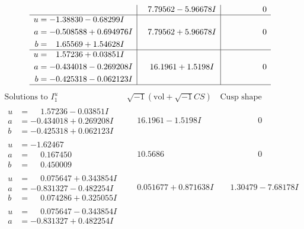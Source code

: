 \documentclass[1p]{elsarticle_modified}
\theoremstyle{definition}
\newcommand{\I}{\sqrt{-1}}
\begin{document}
$$\begin{array}{c|c|c}
 & \phantom{-}7.79562 - 5.96678 I & \phantom{-0.000000 } 0 \\ \hline\begin{aligned}
u &= -1.38830 - 0.68299 I \\
a &= -0.508588 + 0.694976 I \\
b &= \phantom{-}1.65569 + 1.54628 I\end{aligned}
 & \phantom{-}7.79562 + 5.96678 I & \phantom{-0.000000 } 0 \\ \hline\begin{aligned}
u &= \phantom{-}1.57236 + 0.03851 I \\
a &= -0.434018 - 0.269208 I \\
b &= -0.425318 - 0.062123 I\end{aligned}
 & \phantom{-}16.1961 + 1.5198 I & \phantom{-0.000000 } 0\\
 \hline 
 \end{array}$$\newpage$$\begin{array}{c|c|c}  
\text{Solutions to }I^u_{1}& \I (\text{vol} + \sqrt{-1}CS) & \text{Cusp shape}\\
 \hline 
\begin{aligned}
u &= \phantom{-}1.57236 - 0.03851 I \\
a &= -0.434018 + 0.269208 I \\
b &= -0.425318 + 0.062123 I\end{aligned}
 & \phantom{-}16.1961 - 1.5198 I & \phantom{-0.000000 } 0 \\ \hline\begin{aligned}
u &= -1.62467\phantom{ +0.000000I} \\
a &= \phantom{-}0.167450\phantom{ +0.000000I} \\
b &= \phantom{-}0.450009\phantom{ +0.000000I}\end{aligned}
 & \phantom{-}10.5686\phantom{ +0.000000I} & \phantom{-0.000000 } 0 \\ \hline\begin{aligned}
u &= \phantom{-}0.075647 + 0.343854 I \\
a &= -0.831327 - 0.482254 I \\
b &= \phantom{-}0.074286 + 0.325055 I\end{aligned}
 & \phantom{-}0.051677 + 0.871638 I & \phantom{-}1.30479 - 7.68178 I \\ \hline\begin{aligned}
u &= \phantom{-}0.075647 - 0.343854 I \\
a &= -0.831327 + 0.482254 I \\

\end{aligned}
\end{array}$$
\end{document}

